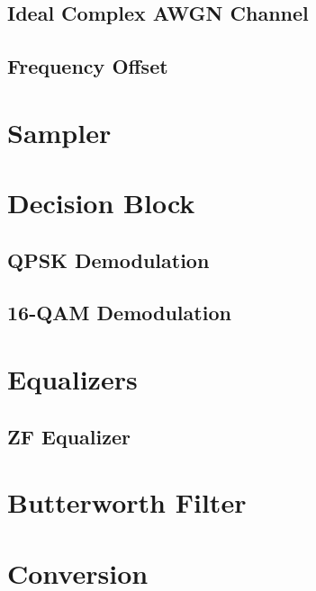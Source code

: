 \documentclass[]{article}
\begin{document}
\subsection{Ideal Complex AWGN Channel}
\label{app:awgn_channel}


\subsection{Frequency Offset}
\label{app:freq}


\section{Sampler}
\label{app:sampler}


\section{Decision Block}
\label{app:dblocks}
\subsection{QPSK Demodulation}
\label{app:qpsk_demod}


\subsection{16-QAM Demodulation}
\label{app:16qam_demod}


\section{Equalizers}
\subsection{ZF Equalizer}
\label{app:zf}



\section{Butterworth Filter}
\label{app:butterworth}


\section{Conversion}
\label{app:convert}
\end{document}
